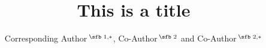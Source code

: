 \documentclass[nocrop]{bioinfo}
\begin{document}

\subtitle{}

\title[short Title]{This is a title}
\author[Sample \textit{et~al}.]{Corresponding Author\,$^{\text{\sfb 1,}*}$, Co-Author\,$^{\text{\sfb 2}}$ and Co-Author\,$^{\text{\sfb 2,}*}$}
\address{$^{\text{\sf 1}}$Department, Institution, City, Post Code, Country and \\
$^{\text{\sf 2}}$Department, Institution, City, Post Code,
Country.}


\history{}

\editor{}



\maketitle







\vspace*{-10pt}


\vspace*{-12pt}


\vspace*{-12pt}



\clearpage
\appendix
\renewcommand{\thesection}{\Alph{section}}

\end{document}
